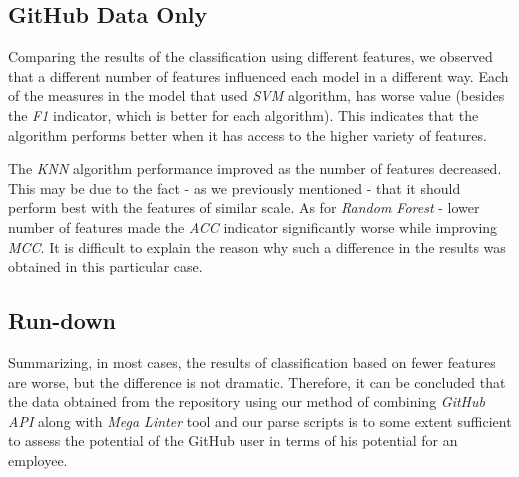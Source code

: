 \subsection{GitHub Data Only}

Comparing the results of the classification using different features, we observed that a different number of features influenced each model in a different way. Each of the measures in the model that used \emph{SVM} algorithm, has worse value (besides the \emph{F1} indicator, which is better for each algorithm). This indicates that the algorithm performs better when it has access to the higher variety of features. 

The \emph{KNN} algorithm performance improved as the number of features decreased. This may be due to the fact - as we previously mentioned - that it should perform best with the features of similar scale. As for \emph{Random Forest} - lower number of features made the \emph{ACC} indicator significantly worse while improving \emph{MCC}. It is difficult to explain the reason why such a difference in the results was obtained in this particular case.


\subsection{Run-down}

Summarizing, in most cases, the results of classification based on fewer features are worse, but the difference is not dramatic. Therefore, it can be concluded that the data obtained from the repository using our method of combining \emph{GitHub API} along with \emph{Mega Linter} tool and our parse scripts is to some extent sufficient to assess the potential of the GitHub user in terms of his potential for an employee.
